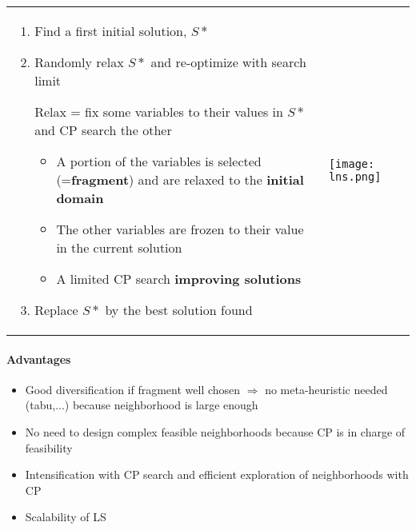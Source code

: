 \begin{tabular}{m{10cm}m{6cm}}
    \begin{enumerate}

        \item Find a first initial solution, $S*$
        \item Randomly relax $S*$ and re-optimize with search limit

            Relax = fix some variables to their values in $S*$ and CP
            search the other

            \begin{itemize}
                \item A portion of the variables is selected (=\textbf{fragment})
                    and are relaxed to the \textbf{initial domain}
                \item The other variables are frozen to their value in the current solution
                \item A limited CP search \textbf{improving solutions}
            \end{itemize}

        \item Replace $S*$ by the best solution found
    \end{enumerate}

    &
    \texttt{[image: lns.png]}
\end{tabular}

\paragraph{Advantages}
\begin{itemize}
    \item Good diversification if fragment well chosen $\Rightarrow$ no
        meta-heuristic needed (tabu,...) because neighborhood is large
        enough
    \item No need to design complex feasible neighborhoods because CP
        is in charge of feasibility

    \item Intensification with CP search and efficient 
        exploration of neighborhoods with CP
    \item Scalability of LS
\end{itemize}


